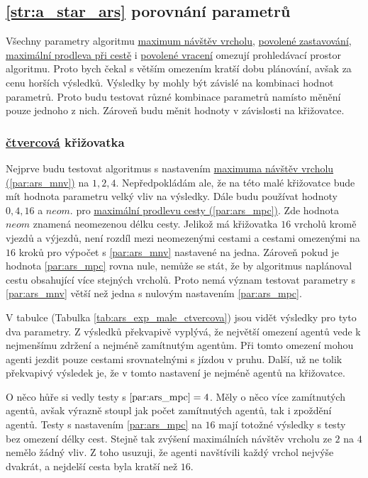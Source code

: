 \subsection{\ref{str:a_star_ars} porovnání parametrů}\label{subsec:ars_porovnani_parametru}

Všechny parametry algoritmu \hyperref[par:ars_mnv]{maximum návštěv vrcholu}, \hyperref[par:ars_pz]{povolené zastavování},
\hyperref[par:ars_mpc]{maximální prodleva při cestě} i \hyperref[par:ars_pv]{povolené vracení} omezují prohledávací
prostor algoritmu.
Proto bych čekal s větším omezením kratší dobu plánování, avšak za cenu horších výsledků.
Výsledky by mohly být závislé na kombinaci hodnot parametrů.
Proto budu testovat různé kombinace parametrů namísto měnění pouze jednoho z nich.
Zároveň budu měnit hodnoty v závislosti na křižovatce.

\subsubsection{ \hyperref[subsec:ctvercovy_typ]{čtvercová} křižovatka}
\label{subsubsec:exp_ars_mala_ctvercovakrizovatka}

Nejprve budu testovat algoritmus s nastavením \hyperref[par:ars_mnv]{maximuma návštěv vrcholu (\ref{par:ars_mnv})} na $1, 2, 4$.
Nepředpokládám ale, že na této malé křižovatce bude mít hodnota parametru velký vliv na výsledky.
Dále budu používat hodnoty $0, 4, 16$ a $neom.$ pro \hyperref[par:ars_mpc]{maximální prodlevu cesty (\ref{par:ars_mpc})}.
Zde hodnota $neom$ znamená neomezenou délku cesty.
Jelikož má křižovatka $16$ vrcholů kromě vjezdů a výjezdů, není rozdíl mezi neomezenými cestami a
cestami omezenými na $16$ kroků pro výpočet s \ref{par:ars_mnv} nastavené na jedna.
Zároveň pokud je hodnota \ref{par:ars_mpc} rovna nule, nemůže se stát,
že by algoritmus naplánoval cestu obsahující více stejných vrcholů.
Proto nemá význam testovat parametry s \ref{par:ars_mnv} větší než jedna s nulovým nastavením \ref{par:ars_mpc}.

V tabulce (Tabulka \ref{tab:ars_exp_male_ctvercova}) jsou vidět výsledky pro tyto dva parametry.
Z výsledků překvapivě vyplývá, že největší omezení agentů vede k nejmenšímu zdržení a nejméně zamítnutým agentům.
Při tomto omezení mohou agenti jezdit pouze cestami srovnatelnými s jízdou v pruhu.
Další, už ne tolik překvapivý výsledek je, že v tomto nastavení je nejméně agentů na křižovatce.

O něco hůře si vedly testy s $\ref{par:ars_mpc} = 4$.
Měly o něco více zamítnutých agentů, avšak výrazně stoupl jak počet zamítnutých agentů, tak i zpoždění agentů.
Testy s nastavením \ref{par:ars_mpc} na $16$ mají totožné výsledky s testy bez omezení délky cest.
Stejně tak zvýšení maximálních návštěv vrcholu ze $2$ na $4$ nemělo žádný vliv.
Z toho usuzuji, že agenti navštívili každý vrchol nejvýše dvakrát, a nejdelší cesta byla kratší než $16$.

